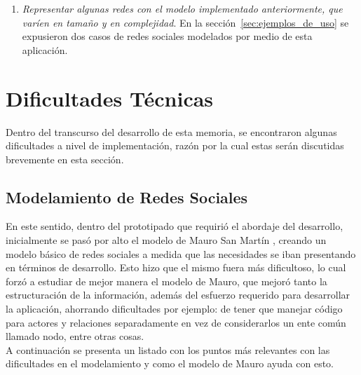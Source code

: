 \begin{enumerate}
  \item \emph{Representar algunas redes con el modelo implementado anteriormente, que varíen en tamaño y en complejidad}. En la sección~\ref{sec:ejemplos_de_uso} se expusieron dos casos de redes sociales modelados por medio de esta aplicación.
  
\end{enumerate}



\section{Dificultades Técnicas} %
\label{sec:dificultades_tecnicas}


Dentro del transcurso del desarrollo de esta memoria, se encontraron algunas dificultades a nivel de implementación, razón por la cual estas serán discutidas brevemente en esta sección.

\subsection{Modelamiento de Redes Sociales} %
\label{sub:modelamiento_de_redes_sociales}

En este sentido, dentro del prototipado que requirió el abordaje del desarrollo, inicialmente se pasó por alto el modelo de Mauro San Martín \cite{tesismauro}, creando un modelo básico de redes sociales a medida que las necesidades se iban presentando en términos de desarrollo. Esto hizo que el mismo fuera más dificultoso, lo cual forzó a estudiar de mejor manera el modelo de Mauro, que mejoró tanto la estructuración de la información, además del esfuerzo requerido para desarrollar la aplicación, ahorrando dificultades por ejemplo: de tener que manejar código para actores y relaciones separadamente en vez de considerarlos un ente común llamado nodo, entre otras cosas.\\

A continuación se presenta un listado con los puntos más relevantes con las dificultades en el modelamiento y como el modelo de Mauro ayuda con esto.

